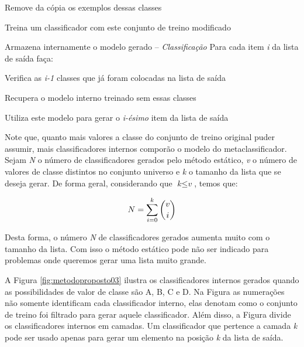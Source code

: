 \quad Remove da cópia os exemplos dessas classes

\quad Treina um classificador com este conjunto de treino modificado

\quad Armazena internamente o modelo gerado\newline
-- \textit{Classificação}\newline
Para cada item \textit{i} da lista de saída faça:

\quad Verifica as \textit{i-1} classes que já foram colocadas na lista de saída

\quad Recupera o modelo interno treinado sem essas classes

\quad Utiliza este modelo para gerar o \textit{i-ésimo} item da lista de saída

\hline
\hfill \break

Note que, quanto mais valores a classe do conjunto de treino original puder assumir, mais classificadores internos comporão o modelo do metaclassificador.
Sejam \textit{N} o número de classificadores gerados pelo método estático, \textit{v} o número de valores de classe distintos no conjunto universo e \textit{k} o tamanho da lista que se deseja gerar. 
De forma geral, considerando que $\textit{k} \leq \textit{v}$, temos que:

\begin{equation*}

\centering
\textit{N} = \sum\limits_{i=0}^k \binom{v}{i}

\end{equation*}

Desta forma, o número \textit{N} de classificadores gerados aumenta muito com o tamanho  da lista.
Com isso o método estático pode não ser indicado para problemas onde queremos gerar uma lista muito grande.

A Figura \ref{fig:metodoproposto03} ilustra os classificadores internos gerados quando as possibilidades de valor de classe são A, B, C e D. Na Figura as numerações não somente identificam cada classificador interno, elas denotam como o conjunto de treino foi filtrado para gerar aquele classificador. Além disso, a Figura divide os classificadores internos em camadas. Um classificador que pertence a camada \textit{k} pode ser usado apenas para gerar um elemento na posição \textit{k} da lista de saída.

